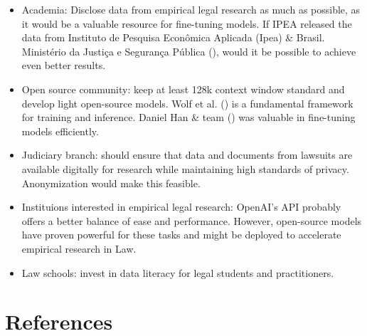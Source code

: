 \documentclass[
  12pt,
]{article}
\begin{document}
\begin{itemize}
\item
  Academia: Disclose data from empirical legal research as much as
  possible, as it would be a valuable resource for fine-tuning models.
  If IPEA released the data from Instituto de Pesquisa Econômica
  Aplicada (Ipea) \& Brasil. Ministério da Justiça e Segurança Pública
  (),
  would it be possible to achieve even better results.
\item
  Open source community: keep at least 128k context window standard and
  develop light open-source models. Wolf et al.
  () is a fundamental
  framework for training and inference. Daniel Han \& team
  () was valuable in
  fine-tuning models efficiently.
\item
  Judiciary branch: should ensure that data and documents from lawsuits
  are available digitally for research while maintaining high standards
  of privacy. Anonymization would make this feasible.
\item
  Instituions interested in empirical legal research: OpenAI's API
  probably offers a better balance of ease and performance. However,
  open-source models have proven powerful for these tasks and might be
  deployed to accelerate empirical research in Law.
\item
  Law schools: invest in data literacy for legal students and
  practitioners.
\end{itemize}

\section{References}\label{references}
\end{document}
